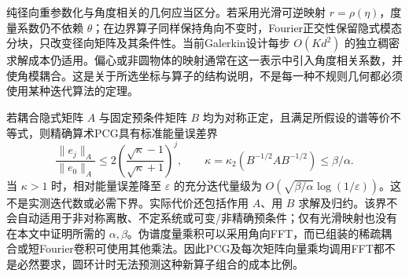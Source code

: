 纯径向重参数化与角度相关的几何应当区分。若采用光滑可逆映射 $r=\rho(\eta)$，度量系数仍不依赖 $\theta$；在边界算子同样保持角向不变时，Fourier正交性保留隐式模态分块，只改变径向矩阵及其条件性。当前Galerkin设计每步 $O(Kd^2)$ 的独立稠密求解成本仍适用。偏心或非圆物体的映射通常在这一表示中引入角度相关系数，并使角模耦合。这是关于所选坐标与算子的结构说明，不是每一种不规则几何都必须使用某种迭代算法的定理。

若耦合隐式矩阵 $A$ 与固定预条件矩阵 $B$ 均为对称正定，且满足所假设的谱等价不等式，则精确算术PCG具有标准能量误差界\cite{r21}
\begin{equation}
 \frac{\|e_j\|_A}{\|e_0\|_A}
 \leq2\left(\frac{\sqrt{\kappa}-1}{\sqrt{\kappa}+1}\right)^j,
 \qquad \kappa=\kappa_2(B^{-1/2}AB^{-1/2})\leq\beta/\alpha.
 \label{eq:geometry-pcg-bound}
\end{equation}
当 $\kappa>1$ 时，相对能量误差降至 $\varepsilon$ 的充分迭代量级为 $O(\sqrt{\beta/\alpha}\log(1/\varepsilon))$。这不是实测迭代数或必需下界。实际代价还包括作用 $A$、用 $B$ 求解及归约。该界不会自动适用于非对称离散、不定系统或可变/非精确预条件；仅有光滑映射也没有在本文中证明所需的 $\alpha,\beta$。伪谱度量乘积可以采用角向FFT，而已组装的稀疏耦合或短Fourier卷积可使用其他乘法。因此PCG及每次矩阵向量乘均调用FFT都不是必然要求，圆环计时无法预测这种新算子组合的成本比例。

